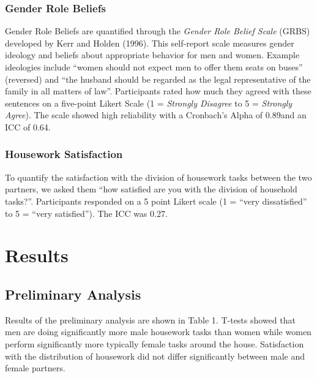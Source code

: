 \documentclass[
  man,floatsintext]{apa6}
\begin{document}
\hypertarget{gender-role-beliefs}{%
\subsubsection{Gender Role Beliefs}\label{gender-role-beliefs}}

Gender Role Beliefs are quantified through the \emph{Gender Role Belief Scale} (GRBS) developed by Kerr and Holden (1996). This self-report scale measures gender ideology and beliefs about appropriate behavior for men and women. Example ideologies include ``women should not expect men to offer them seats on buses'' (reversed) and ``the husband should be regarded as the legal representative of the family in all matters of law''. Participants rated how much they agreed with these sentences on a five-point Likert Scale (1 = \emph{Strongly Disagree} to 5 = \emph{Strongly Agree}). The scale showed high reliability with a Cronbach's Alpha of 0.89and an ICC of 0.64.

\hypertarget{housework-satisfaction}{%
\subsubsection{Housework Satisfaction}\label{housework-satisfaction}}

To quantify the satisfaction with the division of housework tasks between the two partners, we asked them ``how satisfied are you with the division of household tasks?''. Participants responded on a 5 point Likert scale (1 = ``very dissatisfied'' to 5 = ``very satisfied''). The ICC was 0.27.

\hypertarget{results}{%
\section{Results}\label{results}}

\hypertarget{preliminary-analysis}{%
\subsection{Preliminary Analysis}\label{preliminary-analysis}}

Results of the preliminary analysis are shown in Table 1. T-tests showed that men are doing significantly more male housework tasks than women while women perform significantly more typically female tasks around the house. Satisfaction with the distribution of housework did not differ significantly between male and female partners.

\newpage
\end{document}
